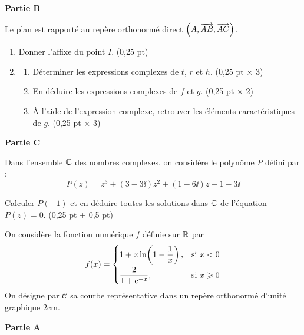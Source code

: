 \medskip
\noindent\textbf{Partie B}

Le plan est rapporté au repère orthonormé direct $\left(A,\overrightarrow{AB},\overrightarrow{AC}\right)$.

\begin{enumerate}
	\item Donner l'affixe du point $I$. \hfill (0,25 pt)
	\item
	\begin{enumerate}
		\item Déterminer les expressions complexes de $t$, $r$ et $h$. \hfill (0,25 pt $\times$ 3)
		\item En déduire les expressions complexes de $f$ et $g$. \hfill (0,25 pt $\times$ 2)
		\item À l'aide de l'expression complexe, retrouver les éléments caractéristiques de $g$. \hfill (0,25 pt $\times$ 3)
	\end{enumerate}
\end{enumerate}

\medskip
\noindent\textbf{Partie C}

Dans l'ensemble $\mathbb{C}$ des nombres complexes, on considère le polynôme $P$ défini par :
$$
P(z) = z^3 + (3-3\ii)z^2 + (1-6\ii)z - 1 - 3\ii
$$

Calculer $P(-1)$ et en déduire toutes les solutions dans $\mathbb{C}$ de l'équation $P(z) = 0$. \hfill (0,25 pt + 0,5 pt)




On considère la fonction numérique $f$ définie sur $\mathbb{R}$ par
$$
f(x) =
\begin{cases}
	1 + x\ln\!\left(1 - \dfrac{1}{x}\right), & \text{si } x < 0 \\[8pt]
	\dfrac{2}{1+\mathrm{e}^{-x}}, & \text{si } x \geqslant 0
\end{cases}
$$
On désigne par $\mathscr{C}$ sa courbe représentative dans un repère orthonormé d'unité graphique $2\text{cm}$.

\medskip
\noindent\textbf{Partie A}

